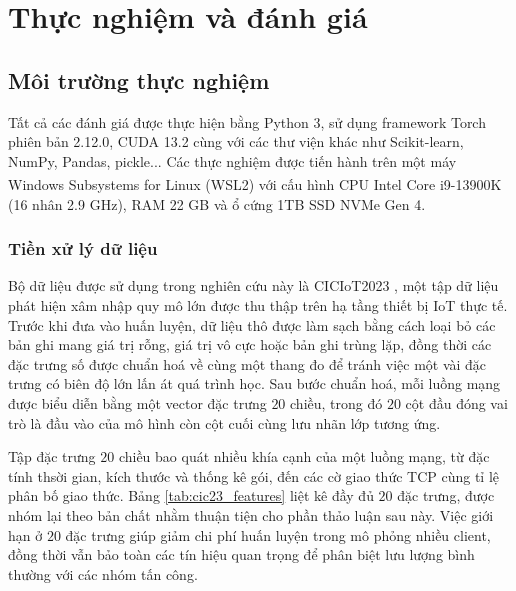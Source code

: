 
\chapter{Thực nghiệm và đánh giá}

\section{Môi trường thực nghiệm}
\label{sec:exp_setup}

Tất cả các đánh giá được thực hiện bằng Python 3, sử dụng framework Torch phiên bản 2.12.0, CUDA 13.2 cùng với các thư viện khác như Scikit-learn, NumPy, Pandas, pickle... Các thực nghiệm được tiến hành trên một máy Windows Subsystems for Linux (WSL2) với cấu hình CPU Intel Core \textsuperscript{\textregistered} i9-13900K (16 nhân 2.9 GHz), RAM 22 GB và ổ cứng 1TB SSD NVMe Gen 4.

\subsection{Tiền xử lý dữ liệu}
Bộ dữ liệu được sử dụng trong nghiên cứu này là CICIoT2023 \cite{ciciot2023}, một tập dữ liệu phát hiện xâm nhập quy mô lớn được thu thập trên hạ tầng thiết bị IoT thực tế. Trước khi đưa vào huấn luyện, dữ liệu thô được làm sạch bằng cách loại bỏ các bản ghi mang giá trị rỗng, giá trị vô cực hoặc bản ghi trùng lặp, đồng thời các đặc trưng số được chuẩn hoá về cùng một thang đo để tránh việc một vài đặc trưng có biên độ lớn lấn át quá trình học. Sau bước chuẩn hoá, mỗi luồng mạng được biểu diễn bằng một vector đặc trưng $20$ chiều, trong đó $20$ cột đầu đóng vai trò là đầu vào của mô hình còn cột cuối cùng lưu nhãn lớp tương ứng.

Tập đặc trưng $20$ chiều bao quát nhiều khía cạnh của một luồng mạng, từ đặc tính thsời gian, kích thước và thống kê gói, đến các cờ giao thức TCP cùng tỉ lệ phân bố giao thức. Bảng \ref{tab:cic23_features} liệt kê đầy đủ $20$ đặc trưng, được nhóm lại theo bản chất nhằm thuận tiện cho phần thảo luận sau này. Việc giới hạn ở $20$ đặc trưng giúp giảm chi phí huấn luyện trong mô phỏng nhiều client, đồng thời vẫn bảo toàn các tín hiệu quan trọng để phân biệt lưu lượng bình thường với các nhóm tấn công.

